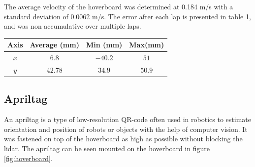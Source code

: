\documentclass[nofilelist]{cslthse-msc}
\begin{document}
The average velocity of the hoverboard was determined at 0.184 m/s with a standard deviation of 0.0062 m/s. The error after each lap is presented in table \ref{tab:hoverboard-error}, and was non accumulative over multiple laps. 

\begin{table}[!hbt]
   \centering
   \label{tab:hoverboard-error}
   \begin{tabular}{|c|c|c|c|}
      \hline
      \textbf{Axis} & \textbf{Average (mm)} & \textbf{Min (mm)} & \textbf{Max(mm)} \\
      \hline
      $x$ & $6.8 $ & $-40.2$ & $51$ \\
      \hline
      $y$ & $42.78$ & $34.9$ & $50.9$ \\
      \hline
   \end{tabular}
\end{table}

\subsection{Apriltag}
An apriltag is a type of low-resolution QR-code often used in robotics to estimate orientation and position of robots or objects with the help of computer vision. It was fastened on top of the hoverboard as high as possible without blocking the lidar. The apriltag can be seen mounted on the hoverboard in figure \ref{fig:hoverboard}.
\end{document}
